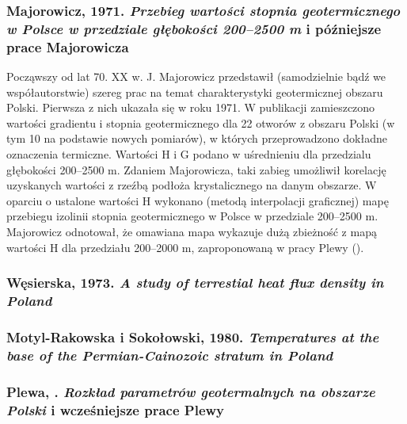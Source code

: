 \documentclass[11.5pt,twoside]{report}
\begin{document}
\subsubsection{Majorowicz, 1971. \textit{Przebieg wartości stopnia geotermicznego w Polsce w przedziale głębokości 200--2500 m} i pó\'{z}niejsze prace Majorowicza}
Począwszy od lat 70. XX w. J. Majorowicz przedstawił (samodzielnie bądź we współautorstwie) szereg prac na temat charakterystyki geotermicznej obszaru Polski. Pierwsza z nich ukazała się w roku 1971. W publikacji zamieszczono wartości gradientu i stopnia geotermicznego dla 22 otworów z obszaru Polski (w tym 10 na podstawie nowych pomiarów), w których przeprowadzono dokładne oznaczenia termiczne. Wartości H i G podano w uśrednieniu dla przedzialu głębokości 200--2500 m. Zdaniem Majorowicza, taki zabieg umożliwił korelację uzyskanych wartości z rzeźbą podłoża krystalicznego na danym obszarze. W oparciu o ustalone wartości H wykonano (metodą interpolacji graficznej) mapę przebiegu izolinii stopnia geotermicznego w Polsce w przedziale 200--2500 m. Majorowicz odnotował, że omawiana mapa wykazuje dużą zbieżność z mapą wartości H dla przedziału 200--2000 m, zaproponowaną w pracy Plewy (\citeyear{Plewa.1966}).

\subsubsection{Węsierska, 1973. \textit{A study of terrestial heat flux density in Poland}} 

\subsubsection{Motyl-Rakowska i Sokołowski, 1980. \textit{Temperatures at the base of the Permian-Cainozoic stratum in Poland}}

\subsubsection{Plewa, \citeyear{Plewa.1994}. \textit{Rozkład parametrów geotermalnych na obszarze Polski} i wcześniejsze prace Plewy}
\end{document}
